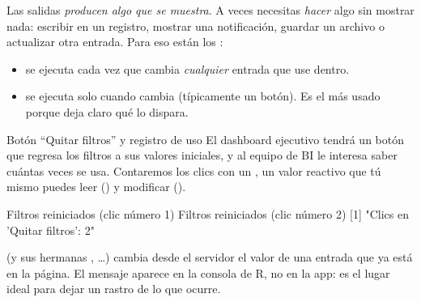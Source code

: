 Las salidas \emph{producen algo que se muestra}. A veces necesitas
\emph{hacer} algo sin mostrar nada: escribir en un registro, mostrar una
notificación, guardar un archivo o actualizar otra entrada. Para eso están
los :

\begin{itemize}
  \item {} se ejecuta cada vez que cambia
        \emph{cualquier} entrada que use dentro.
  \item {} se ejecuta solo cuando cambia
         (típicamente un botón). Es el más usado porque deja
        claro qué lo dispara.
\end{itemize}

\begin{ejemplo}{Botón ``Quitar filtros'' y registro de uso}
El dashboard ejecutivo tendrá un botón que regresa los filtros a sus
valores iniciales, y al equipo de BI le interesa saber cuántas veces se
usa. Contaremos los clics con un , un valor reactivo
que tú mismo puedes leer () y modificar
().
\end{ejemplo}

\begin{rsalida}
Filtros reiniciados (clic número 1)
Filtros reiniciados (clic número 2)
[1] "Clics en 'Quitar filtros': 2"
\end{rsalida}

 (y sus hermanas ,
\ldots) cambia desde el servidor el valor de
una entrada que ya está en la página. El mensaje aparece en la consola de R,
no en la app: es el lugar ideal para dejar un rastro de lo que ocurre.

